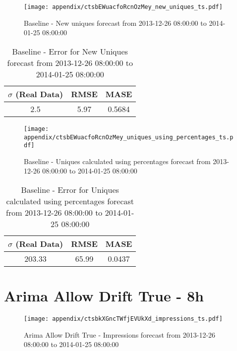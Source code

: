 \begin{figure}[H] \begin{center} \leavevmode
\texttt{[image: appendix/ctsbEWuacfoRcnOzMey\_new\_uniques\_ts.pdf]} \caption[]{
Baseline - New uniques forecast from 2013-12-26 08:00:00 to 2014-01-25 08:00:00} \label{fig:appendix/ctsbEWuacfoRcnOzMey_new_uniques_ts.pdf} \end{center}
\end{figure}

\begin{table}[H]
\centering
\footnotesize
\begin{tabular}{ccc}
$\sigma$ (Real Data) & RMSE & MASE   \\ \hline
2.5 & 5.97 & 0.5684 \\
\end{tabular}

\vspace{0.5cm}

\caption[]{
Baseline - Error for New Uniques forecast from 2013-12-26 08:00:00 to 2014-01-25 08:00:00}
\end{table}

\begin{figure}[H] \begin{center} \leavevmode
\texttt{[image: appendix/ctsbEWuacfoRcnOzMey\_uniques\_using\_percentages\_ts.pdf]} \caption[]{
Baseline - Uniques calculated using percentages forecast from 2013-12-26 08:00:00 to 2014-01-25 08:00:00} \label{fig:appendix/ctsbEWuacfoRcnOzMey_uniques_using_percentages_ts.pdf} \end{center}
\end{figure}

\begin{table}[H]
\centering
\footnotesize
\begin{tabular}{ccc}
$\sigma$ (Real Data) & RMSE & MASE   \\ \hline
203.33 & 65.99 & 0.0437 \\
\end{tabular}

\vspace{0.5cm}

\caption[]{
Baseline - Error for Uniques calculated using percentages forecast from 2013-12-26 08:00:00 to 2014-01-25 08:00:00}
\end{table}

\section{Arima Allow Drift True - 8h}
\begin{figure}[H] \begin{center} \leavevmode
\texttt{[image: appendix/ctsbkXGncTWfjEVUkXd\_impressions\_ts.pdf]} \caption[]{
Arima Allow Drift True - Impressions forecast from 2013-12-26 08:00:00 to 2014-01-25 08:00:00} \label{fig:appendix/ctsbkXGncTWfjEVUkXd_impressions_ts.pdf} \end{center}
\end{figure}

